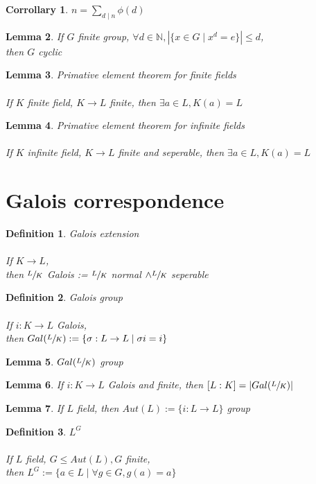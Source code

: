 \documentclass{article}
\theoremstyle{definitionstyle}
\newtheorem{defn}{Definition}[section]
\theoremstyle{lemmastyle}
\newtheorem{lem}{Lemma}[section]
\newtheorem{cor}[lem]{Corrollary}
\theoremstyle{remark}
\begin{document}
\begin{cor} $n = \displaystyle \sum_{d \mid n}{\phi(d)}$ \end{cor}

\begin{lem} If $G$ finite group, $\forall d \in \mathbb{N}, |\{x \in G \mid x^d = e\}| \le d $,\\

then $G$ cyclic
\end{lem}
\begin{lem} Primative element theorem for finite fields\\
\\
If $K$ finite field, $K \to L$ finite, then $\exists a \in L, K(a) = L$ \end{lem}
\begin{lem} Primative element theorem for infinite fields\\
\\
If $K$ infinite field, $K \to L$ finite and seperable, then $\exists a \in L, K(a) = L$ \end{lem}

\section{Galois correspondence}
\begin{defn} Galois extension\\
\\
If $K \to L$,\\

then $\sfrac{L}{K}$ Galois := $\sfrac{L}{K}$ normal $\land \sfrac{L}{K}$ seperable \end{defn}
\begin{defn} Galois group\\
\\
If $i: K \to L$ Galois,\\

then $Gal(\sfrac{L}{K}):=\{\sigma : L \to L \mid \sigma i = i\}$ \end{defn}
\begin{lem} $Gal(\sfrac{L}{K})$ group \end{lem}
\begin{lem} If $i: K \to L$ Galois and finite, then $[L:K] = |Gal(\sfrac{L}{K})|$ \end{lem}
\begin{lem} If $L$ field, then $Aut(L):= \{i : L \to L\}$ group \end{lem}
\begin{defn}$L^G$\\
\\
If $L$ field, $G \le Aut(L), G$ finite,\\

then $L^G := \{ a \in L \mid \forall g \in G, g(a) = a\}$ \end{defn}
\end{document}
